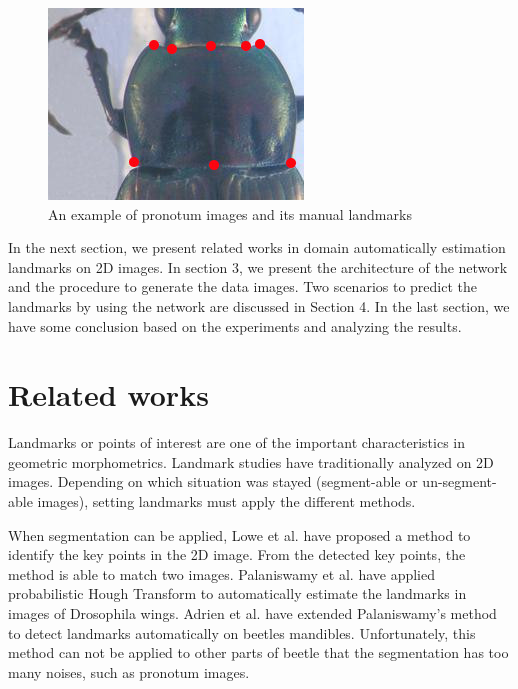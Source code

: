 \documentclass[10pt]{article}
\begin{document}
\begin{figure}[htbp]
\centering
	\centerline{\includegraphics[scale=0.8]{images/pronotum}}
	\caption{An example of pronotum images and its manual landmarks}
	\label{figpronotum}
\end{figure}

In the next section, we present related works in domain automatically estimation landmarks on 2D images. In section 3, we present the architecture of the network and the procedure to generate the data images. Two scenarios to predict the landmarks by using the network are discussed in Section 4. In the last section, we have some conclusion based on the experiments and analyzing the results.

\section{Related works}
Landmarks or points of interest are one of the important characteristics in geometric morphometrics. Landmark studies have traditionally analyzed on 2D images. Depending on which situation was stayed (segment-able or un-segment-able images), setting landmarks must apply the different methods.

When segmentation can be applied, Lowe et al. \cite{lowe2004distinctive} have proposed a method to identify the key points in the 2D image. From the detected key points, the method is able to match two images. Palaniswamy et al. \cite{palaniswamy2010automatic} have applied probabilistic Hough Transform to automatically estimate the landmarks in images of Drosophila wings. Adrien et al. \cite{le2017maelab} have extended Palaniswamy's method to detect landmarks automatically on beetles mandibles. Unfortunately, this method can not be applied to other parts of beetle that the segmentation has too many noises, such as pronotum images.
\end{document}
